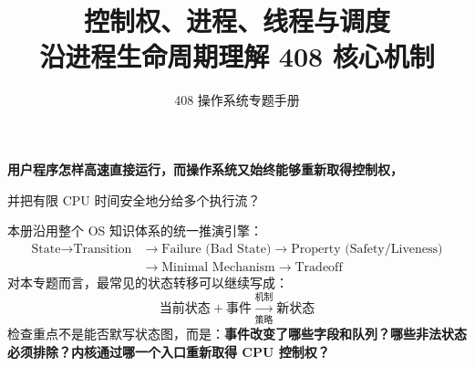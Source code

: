 \documentclass[11pt,a4paper]{ctexart}
\title{\vspace{-1.2cm}\textbf{控制权、进程、线程与调度}\\[0.4em]
\large 沿进程生命周期理解 408 核心机制}
\author{408 操作系统专题手册}
\date{}
\newcommand{\kw}[1]{\textbf{#1}}
\begin{document}
\maketitle
\begin{corebox}[核心问题]

\begin{center}
\Large\bfseries 用户程序怎样高速直接运行，而操作系统又始终能够重新取得控制权，\par
并把有限 CPU 时间安全地分给多个执行流？
\end{center}

本册沿用整个 OS 知识体系的统一推演引擎：
\[
\boxed{
\begin{aligned}
\text{State} \rightarrow \text{Transition} &\rightarrow \text{Failure (Bad State)} \rightarrow \text{Property (Safety/Liveness)}\\
&\rightarrow \text{Minimal Mechanism} \rightarrow \text{Tradeoff}
\end{aligned}
}
\]
对本专题而言，最常见的状态转移可以继续写成：
\[
\boxed{\text{当前状态}+\text{事件}\xrightarrow[\text{策略}]{\text{机制}}\text{新状态}}
\]
检查重点不是能否默写状态图，而是：\kw{事件改变了哪些字段和队列？哪些非法状态必须排除？内核通过哪一个入口重新取得 CPU 控制权？}
\end{corebox}
\end{document}
